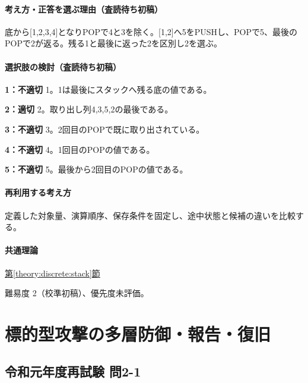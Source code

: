 \paragraph{考え方・正答を選ぶ理由（査読待ち初稿）} 底から[1,2,3,4]となりPOPで4と3を除く。[1,2]へ5をPUSHし、POPで5、最後のPOPで2が返る。残る1と最後に返った2を区別し2を選ぶ。

\paragraph{選択肢の検討（査読待ち初稿）}\mbox{}\par

\noindent\textbf{1：不適切} 1。1は最後にスタックへ残る底の値である。\par

\noindent\textbf{2：適切} 2。取り出し列4,3,5,2の最後である。\par

\noindent\textbf{3：不適切} 3。2回目のPOPで既に取り出されている。\par

\noindent\textbf{4：不適切} 4。1回目のPOPの値である。\par

\noindent\textbf{5：不適切} 5。最後から2回目のPOPの値である。\par

\paragraph{再利用する考え方} 定義した対象量、演算順序、保存条件を固定し、途中状態と候補の違いを比較する。

\paragraph{共通理論} \hyperref[theory:discrete:stack]{第\ref*{theory:discrete:stack}節}

\par 難易度 2（校準初稿）、優先度未評価。

\section{標的型攻撃の多層防御・報告・復旧}

\subsection{令和元年度再試験 問2-1}
\label{q:r01-ret-basic-2-1}

